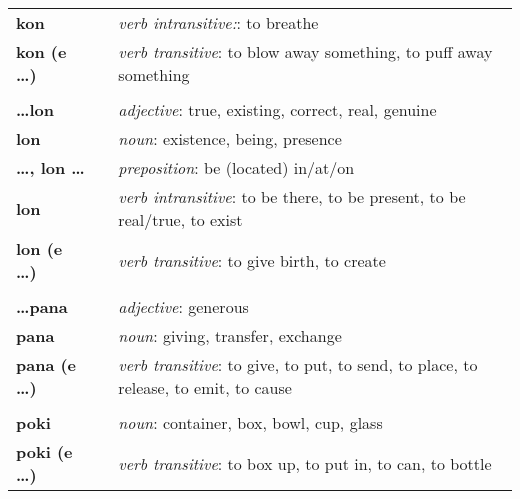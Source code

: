 \begin{supertabular}{p{2,5cm}|ll}
    \textbf{kon}                   &  & \textit{verb intransitive:}: to breathe                                                     \\
    \textbf{kon (e \dots)}         &  & \textit{verb transitive}: to blow away something, to puff away something                    \\
                                   &  &                                                                                             \\
    \textbf{\dots lon}             &  & \textit{adjective}: true, existing, correct, real, genuine                                  \\
    \textbf{lon}                   &  & \textit{noun}: existence, being, presence                                                   \\
    \textbf{\dots , lon \dots}     &  & \textit{preposition}: be (located) in/at/on                                                 \\
    \textbf{lon}                   &  & \textit{verb intransitive}: to be there, to be present, to be real/true, to exist           \\
    \textbf{lon (e \dots)}         &  & \textit{verb transitive}: to give birth, to create                                          \\
                                   &  &                                                                                             \\
    \textbf{\dots pana}            &  & \textit{adjective}: generous                                                                \\
    \textbf{pana}                  &  & \textit{noun}: giving, transfer, exchange                                                   \\
    \textbf{pana (e \dots)}        &  & \textit{verb transitive}: to give, to put, to send, to place, to release, to emit, to cause \\
                                   &  &                                                                                             \\
    \textbf{poki}                  &  & \textit{noun}: container, box, bowl, cup, glass                                             \\
    \textbf{poki (e \dots)}        &  & \textit{verb transitive}: to box up, to put in, to can, to bottle                           \\

\end{supertabular}
